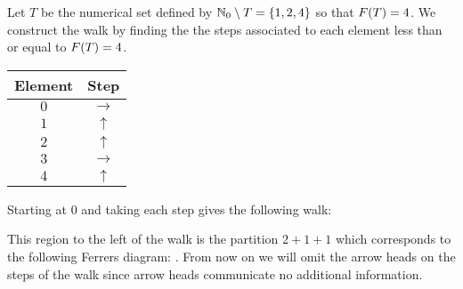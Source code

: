 \begin{examplebox}
    Let \(T\) be the numerical set defined by \(\mathbb{N}_0 \setminus T = \{1, 2, 4\}\) so that \(F(T) = 4\). We construct the walk by finding the the steps associated to each element less than or equal to \(F(T) = 4\).

    \begin{center}
        \begin{tabular}{c|c}
        Element & Step \\
        \hline
        \(0\) & \(\rightarrow\)  \\
        \(1\) & \(\uparrow\) \\
        \(2\) & \(\uparrow\) \\
        \(3\) & \(\rightarrow\) \\
        \(4\) & \(\uparrow\) \\
        \end{tabular}
    \end{center}

    Starting at \(0\) and taking each step gives the following walk:
        \begin{center}
    \begin{center}
    \end{center}
    \end{center}

    This region to the left of the walk is the partition \(2 + 1 + 1\) which corresponds to the following Ferrers diagram: {\tiny {}}. From now on we will omit the arrow heads on the steps of the walk since arrow heads communicate no additional information.
\end{examplebox}

